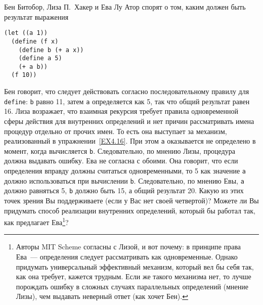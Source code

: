 \begin{exercise}{4.19}%
\label{EX4.19}%
Бен Битобор, Лиза П.~Хакер и Ева Лу Атор спорят о том,
каким должен быть результат выражения

\begin{Verbatim}[fontsize=\small]
(let ((a 1))
  (define (f x)
    (define b (+ a x))
    (define a 5)
    (+ a b))
  (f 10))
\end{Verbatim}
Бен говорит, что следует действовать согласно последовательному
правилу для {\tt define}: {\tt b} равно 11, затем
{\tt a} определяется как 5, так что общий результат равен 16.
Лиза возражает, что взаимная рекурсия требует правила одновременной
сферы действия для внутренних определений и нет причин
рассматривать имена процедур отдельно от прочих имен.  То есть
она выступает за механизм, реализованный в 
упражнении~\ref{EX4.16}.  При этом {\tt a} оказывается не
определено в момент, когда вычисляется {\tt b}.  Следовательно,
по мнению Лизы, процедура должна выдавать ошибку.  Ева не согласна с
обоими.  Она говорит, что если определения вправду должны считаться
одновременными, то 5 как значение {\tt a} должно использоваться
при вычислении {\tt b}.  Следовательно, по мнению Евы,
{\tt a} должно равняться 5, {\tt b} должно быть 15, а
общий результат 20.  Какую из этих точек зрения Вы поддерживаете (если у
Вас нет своей четвертой)?  Можете ли Вы придумать способ реализации
внутренних определений, который бы работал так, как предлагает
Ева\footnote{Авторы MIT Scheme согласны с Лизой, и вот почему: в
принципе права Ева~--- определения следует рассматривать как
одновременные.  Однако придумать универсальный эффективный механизм, который
вел бы себя так, как она требует, кажется трудным.  Если же такого
механизма нет, то лучше порождать ошибку в сложных случаях параллельных
определений (мнение Лизы), чем выдавать неверный ответ (как хочет
Бен).}?
\end{exercise}

